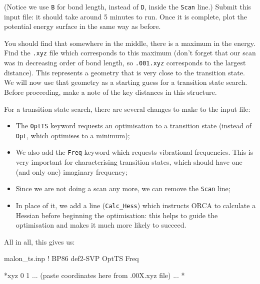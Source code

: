 \documentclass[10pt]{article}
\begin{document}
(Notice we use \texttt{B} for bond length, instead of \texttt{D}, inside the \texttt{Scan} line.) Submit this input file: it should take around 5 minutes to run. Once it is complete, plot the potential energy surface in the same way as before.

You should find that somewhere in the middle, there is a maximum in the energy. Find the \texttt{.xyz} file which corresponds to this maximum (don't forget that our scan was in decreasing order of bond length, so \texttt{.001.xyz} corresponds to the largest distance). This represents a geometry that is very close to the transition state. We will now use that geometry as a starting guess for a transition state search. Before proceeding, make a note of the key  distances in this structure. 

For a transition state search, there are several changes to make to the input file:

\begin{itemize}
    \item The \texttt{OptTS} keyword requests an optimisation to a transition state (instead of \texttt{Opt}, which optimises to a minimum);
    \item We also add the \texttt{Freq} keyword which requests vibrational frequencies. This is very important for characterising transition states, which should have one (and only one) imaginary frequency;
    \item Since we are not doing a scan any more, we can remove the \texttt{Scan} line;
    \item In place of it, we add a line (\texttt{Calc\_Hess}) which instructs ORCA to calculate a Hessian before beginning the optimisation: this helps to guide the optimisation and makes it much more likely to succeed.
\end{itemize}

All in all, this gives us:

\begin{script}{malon\_ts.inp}
! BP86 def2-SVP OptTS Freq



*xyz 0 1
 ... (paste coordinates here from .00X.xyz file) ...
*
\end{script}
\end{document}

